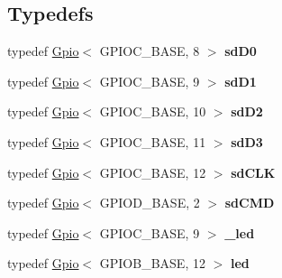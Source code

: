 \subsection*{Typedefs}
\begin{DoxyCompactItemize}
\item 
\hypertarget{namespacemiosix_aafba84f3c349dcfc0937ad2755c68b5c}{typedef \hyperlink{classmiosix_1_1_gpio}{Gpio}$<$ G\-P\-I\-O\-C\-\_\-\-B\-A\-S\-E, 8 $>$ {\bfseries sd\-D0}}\label{namespacemiosix_aafba84f3c349dcfc0937ad2755c68b5c}

\item 
\hypertarget{namespacemiosix_a9e584c39fa725cbf6d8df1d66293f051}{typedef \hyperlink{classmiosix_1_1_gpio}{Gpio}$<$ G\-P\-I\-O\-C\-\_\-\-B\-A\-S\-E, 9 $>$ {\bfseries sd\-D1}}\label{namespacemiosix_a9e584c39fa725cbf6d8df1d66293f051}

\item 
\hypertarget{namespacemiosix_a08f7fa7d876304edd2cd4e21eb72db3c}{typedef \hyperlink{classmiosix_1_1_gpio}{Gpio}$<$ G\-P\-I\-O\-C\-\_\-\-B\-A\-S\-E, 10 $>$ {\bfseries sd\-D2}}\label{namespacemiosix_a08f7fa7d876304edd2cd4e21eb72db3c}

\item 
\hypertarget{namespacemiosix_aaa86cfe664e49658c439904bc956f3ae}{typedef \hyperlink{classmiosix_1_1_gpio}{Gpio}$<$ G\-P\-I\-O\-C\-\_\-\-B\-A\-S\-E, 11 $>$ {\bfseries sd\-D3}}\label{namespacemiosix_aaa86cfe664e49658c439904bc956f3ae}

\item 
\hypertarget{namespacemiosix_a54da06b20695641e20eee504cc88f5da}{typedef \hyperlink{classmiosix_1_1_gpio}{Gpio}$<$ G\-P\-I\-O\-C\-\_\-\-B\-A\-S\-E, 12 $>$ {\bfseries sd\-C\-L\-K}}\label{namespacemiosix_a54da06b20695641e20eee504cc88f5da}

\item 
\hypertarget{namespacemiosix_a78a1a6b2b0fc8f383d85fd01efc07b4f}{typedef \hyperlink{classmiosix_1_1_gpio}{Gpio}$<$ G\-P\-I\-O\-D\-\_\-\-B\-A\-S\-E, 2 $>$ {\bfseries sd\-C\-M\-D}}\label{namespacemiosix_a78a1a6b2b0fc8f383d85fd01efc07b4f}

\item 
\hypertarget{group___hardware_gaf48f3c548e2fa07d8cc734aedbd23619}{typedef \hyperlink{classmiosix_1_1_gpio}{Gpio}$<$ G\-P\-I\-O\-C\-\_\-\-B\-A\-S\-E, 9 $>$ {\bfseries \-\_\-led}}\label{group___hardware_gaf48f3c548e2fa07d8cc734aedbd23619}

\item 
\hypertarget{group___hardware_ga1d025d1f4223e6fb914b47c303438953}{typedef \hyperlink{classmiosix_1_1_gpio}{Gpio}$<$ G\-P\-I\-O\-B\-\_\-\-B\-A\-S\-E, 12 $>$ {\bfseries led}}\label{group___hardware_ga1d025d1f4223e6fb914b47c303438953}


\end{DoxyCompactItemize}
